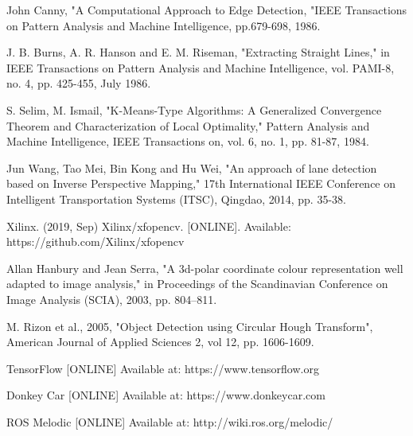 \documentclass[conference]{IEEEtran}
\begin{document}
\begin{thebibliography}{00}
 John Canny, "A Computational Approach to Edge Detection, "IEEE Transactions on Pattern Analysis and Machine Intelligence, pp.679-698, 1986.

 J. B. Burns, A. R. Hanson and E. M. Riseman, "Extracting Straight Lines," in IEEE Transactions on Pattern Analysis and Machine Intelligence, vol. PAMI-8, no. 4, pp. 425-455, July 1986.

 S. Selim, M. Ismail, "K-Means-Type Algorithms: A Generalized Convergence Theorem and Characterization of Local Optimality," Pattern Analysis and Machine Intelligence, IEEE Transactions on, vol. 6, no. 1, pp. 81-87, 1984. 

 Jun Wang, Tao Mei, Bin Kong and Hu Wei, "An approach of lane detection based on Inverse Perspective Mapping," 17th International IEEE Conference on Intelligent Transportation Systems (ITSC), Qingdao, 2014, pp. 35-38.

 Xilinx. (2019, Sep) Xilinx/xfopencv. [ONLINE]. Available:  https://github.com/Xilinx/xfopencv

 Allan Hanbury and Jean Serra, "A 3d-polar coordinate colour representation well adapted to image analysis," in Proceedings of the Scandinavian Conference on Image Analysis (SCIA), 2003, pp. 804–811.

 M. Rizon et al., 2005, "Object Detection using Circular Hough Transform", American Journal of Applied Sciences 2, vol 12, pp. 1606-1609.

 TensorFlow [ONLINE] Available at: https://www.tensorflow.org

 Donkey Car [ONLINE] Available at: https://www.donkeycar.com
\end{thebibliography}

 ROS Melodic [ONLINE] Available at: http://wiki.ros.org/melodic/
\vspace{12pt}
\end{document}
